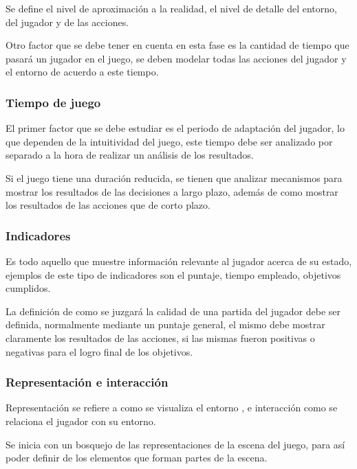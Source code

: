 Se define el nivel de aproximación a la realidad, el nivel de detalle del
entorno, del jugador y de las acciones.

Otro factor que se debe tener en cuenta en esta fase es la cantidad de tiempo
que pasará un jugador en el juego, se deben modelar todas las acciones del
jugador y el entorno de acuerdo a este tiempo.

\subsubsection{Tiempo de juego}

El primer factor que se debe estudiar es el periodo de adaptación del jugador,
lo que dependen de la intuitividad del juego, este tiempo debe ser analizado por
separado a la hora de realizar un análisis de los resultados.

Si el juego tiene una duración reducida, se tienen que analizar mecanismos para
mostrar los resultados de las decisiones a largo plazo, además de como mostrar
los resultados de las acciones que de corto plazo.

\subsubsection{Indicadores}

Es todo aquello que muestre información relevante al jugador acerca de su
estado, ejemplos de este tipo de indicadores son el puntaje, tiempo empleado,
objetivos cumplidos. 

La definición de como se juzgará la calidad de una partida del jugador debe ser
definida, normalmente mediante un puntaje general, el mismo debe mostrar
claramente los resultados de las acciones, si las mismas fueron positivas o
negativas para el logro final de los objetivos.

\subsubsection{Representación e interacción}

Representación se refiere a como se visualiza el entorno
, e interacción como
se relaciona el jugador con su entorno.

Se inicia con un bosquejo de las representaciones de la escena del juego, para
así poder definir de los elementos que forman partes de la escena.

